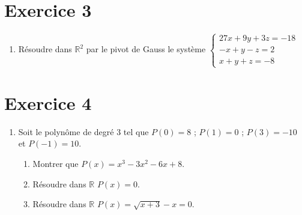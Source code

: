 \documentclass[12pt]{article}
\begin{document}
\section*{Exercice 3}
\begin{enumerate}
\item Résoudre dans \( \mathbb{R}^{2} \) par le pivot de Gauss le système \( \begin{cases} 27x + 9y + 3z = -18\\ -x + y -z = 2\\ x + y + z = -8 \end{cases}\)
\end{enumerate}
\section*{Exercice 4}
\begin{enumerate}
\item Soit le polynôme de degré 3 tel que \( P(0) = 8 \) ; \( P(1) = 0 \) ; \( P(3) = -10 \) et \( P(-1) = 10 \).
\begin{enumerate}
\item Montrer que \( P(x) = x^{3} - 3x^{2} - 6x + 8 \).
\item Résoudre dans \( \mathbb{R} \) \( P(x) = 0 \).
\item Résoudre dans \( \mathbb{R} \) \( P(x) = \sqrt{x+3}-x = 0\).
\end{enumerate}
\end{enumerate}
\end{document}
